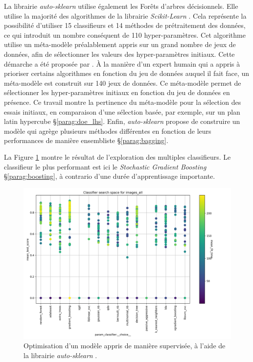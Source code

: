 La librairie \textit{auto-sklearn} \cite{feurer_efficient_2015} utilise également les Forêts d'arbres décisionnels.
Elle utilise la majorité des algorithmes de la librairie \textit{Scikit-Learn} \cite{pedregosa_scikit-learn_2011}.
Cela représente la possibilité d'utiliser 15 classifieurs et 14 méthodes de prétraitement des données, ce qui introduit un nombre conséquent de 110 hyper-paramètres.
Cet algorithme utilise un méta-modèle préalablement appris sur un grand nombre de jeux de données, afin de sélectionner les valeurs des hyper-paramètres initiaux.
Cette démarche a été proposée par \cite{feurer_initializing_2015}.
À la manière d'un expert humain qui a appris à prioriser certains algorithmes en fonction du jeu de données auquel il fait face, un méta-modèle est construit sur 140 jeux de données.
Ce méta-modèle permet de sélectionner les hyper-paramètres initiaux en fonction du jeu de données en présence.
Ce travail montre la pertinence du méta-modèle pour la sélection des essais initiaux, en comparaison d'une sélection basée, par exemple, sur un plan latin hypercube §\ref{parag:doe_lhs}.
Enfin, \textit{auto-sklearn} propose de construire un modèle qui agrège plusieurs méthodes différentes en fonction de leurs performances de manière ensembliste §\ref{parag:bagging}.

La Figure \ref{fig:autosk_result} montre le résultat de l'exploration des multiples classifieurs.
Le classifieur le plus performant est ici le \textit{Stochastic Gradient Boosting} §\ref{parag:boosting}, à contrario d'une durée d'apprentissage importante.

\begin{figure}[hbtp]
    \centering
    \includegraphics[width=\textwidth,height=\textheight,keepaspectratio]{../Chap3/Figures/cv_results_images_all.png}
    \caption{Optimisation d'un modèle appris de manière supervisée, à l'aide de la librairie \textit{auto-sklearn} \cite{feurer_efficient_2015}.}
    \label{fig:autosk_result}
\end{figure}


